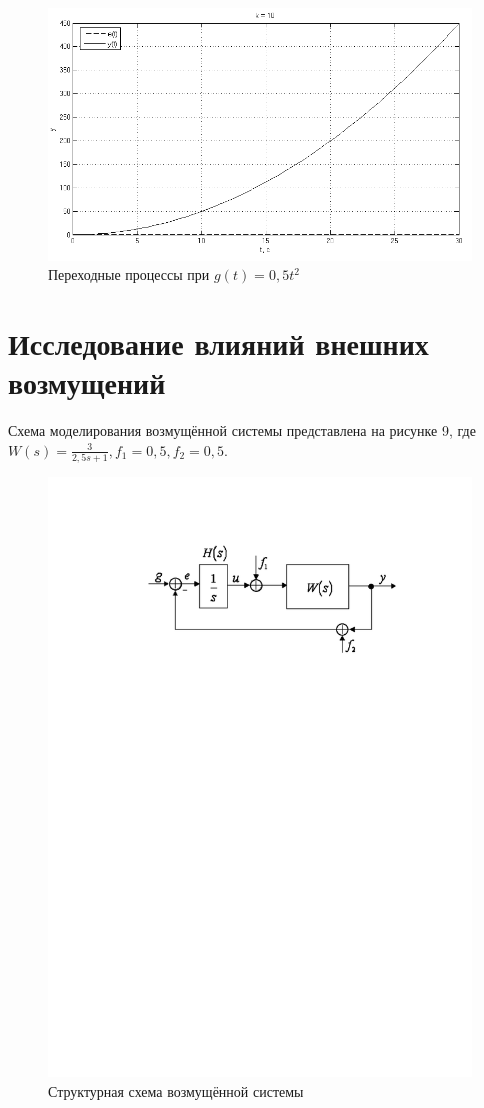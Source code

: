 \documentclass[a4paper, 11pt, russian]{article}
\begin{document}
    \begin{figure}[ht!]
        \centering
        \includegraphics[scale = 0.58]{aInput1ast10k.png}
        \caption{Переходные процессы при $g(t) = 0,5t^2$}
    \end{figure}
    \clearpage
    \section{Исследование влияний внешних возмущений}
    Схема моделирования возмущённой системы представлена на рисунке 9, где $W(s) = \displaystyle{\frac{3}{2,5s + 1}}, f_1 = 0,5, f_2 = 0,5.$\\
    \begin{figure}[ht!]
        \centering
        \includegraphics{disturbScheme}
        \caption{Структурная схема возмущённой системы}
    \end{figure}
    
\end{document}
